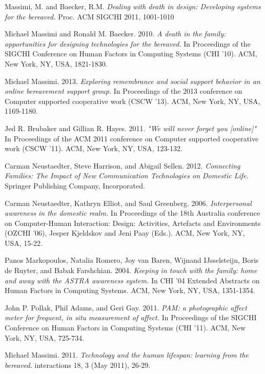 \begin{thebibliography}{9}

  Massimi, M. and Baecker, R.M.
  \emph{Dealing with death in design: Developing systems for the bereaved.}
  Proc. ACM SIGCHI 2011, 1001-1010

  Michael Massimi and Ronald M. Baecker.
  2010.
  \emph{A death in the family: opportunities for designing technologies for the
  bereaved.}
  In Proceedings of the SIGCHI Conference on Human Factors in Computing
  Systems (CHI '10).
  ACM, New York, NY, USA, 1821-1830. 

  Michael Massimi.
  2013.
  \emph{Exploring remembrance and social support behavior in an online
  bereavement support group.}
  In Proceedings of the 2013 conference on Computer supported cooperative
  work (CSCW '13). ACM, New York, NY, USA, 1169-1180. 

  Jed R. Brubaker and Gillian R. Hayes.
  2011.
  \emph{"We will never forget you [online]"}
  In Proceedings of the ACM 2011 conference on Computer supported cooperative
  work
  (CSCW '11). ACM, New York, NY, USA, 123-132. 

  Carman Neustaedter, Steve Harrison, and Abigail Sellen.
  2012.
  \emph{Connecting Families: The Impact of New Communication Technologies on
  Domestic Life.}
  Springer Publishing Company, Incorporated.

  Carman Neustaedter, Kathryn Elliot, and Saul Greenberg.
  2006.
  \emph{Interpersonal awareness in the domestic realm.}
  In Proceedings of the 18th Australia conference on Computer-Human Interaction:
  Design: Activities, Artefacts and Environments (OZCHI '06),
  Jesper Kjeldskov and Jeni Paay (Eds.). ACM, New York, NY, USA, 15-22.

  Panos Markopoulos, Natalia Romero, Joy van Baren, Wijnand IJsselsteijn,
  Boris de Ruyter, and Babak Farshchian.
  2004.
  \emph{Keeping in touch with the family: home and away with the ASTRA awareness
  system.}
  In CHI '04 Extended Abstracts on Human Factors in Computing Systems.
  ACM, New York, NY, USA, 1351-1354.

  John P. Pollak, Phil Adams, and Geri Gay.
  2011.
  \emph{PAM: a photographic affect meter for frequent, in situ measurement of
  affect.}
  In Proceedings of the SIGCHI Conference on Human Factors in Computing Systems
  (CHI '11). ACM, New York, NY, USA, 725-734. 

  Michael Massimi.
  2011.
  \emph{Technology and the human lifespan: learning from the bereaved.}
  interactions 18, 3 (May 2011), 26-29.



\end{thebibliography}
